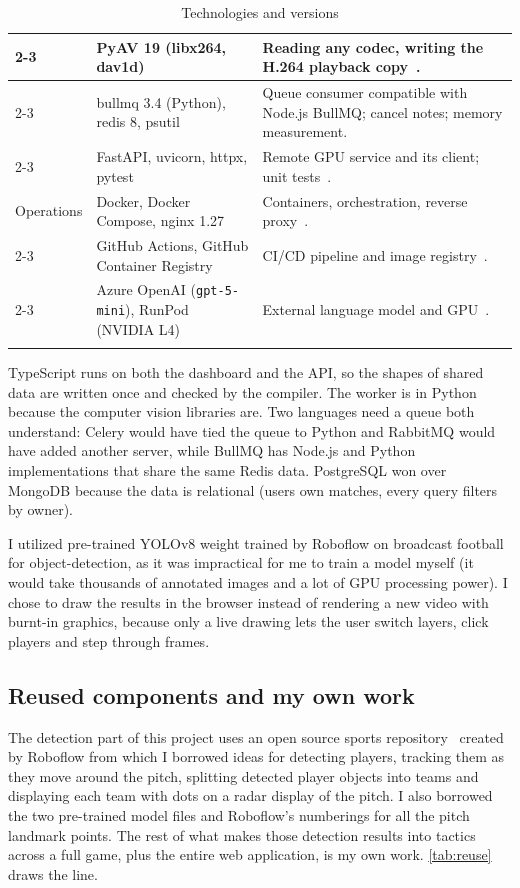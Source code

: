 \begin{longtable}{|p{}|p{}|p{}|}
	\cline{2-3}
	& PyAV 19 (libx264, dav1d) & Reading any codec, writing the H.264 playback copy~\cite{pyav}. \\
	\cline{2-3}
	& bullmq 3.4 (Python), redis 8, psutil & Queue consumer compatible with Node.js BullMQ; cancel notes; memory measurement. \\
	\cline{2-3}
	& FastAPI, uvicorn, httpx, pytest & Remote GPU service and its client; unit tests~\cite{pytest}. \\
	\hline
	Operations & Docker, Docker Compose, nginx 1.27 & Containers, orchestration, reverse proxy~\cite{docker}. \\
	\cline{2-3}
	& GitHub Actions, GitHub Container Registry & CI/CD pipeline and image registry~\cite{ghactions}. \\
	\cline{2-3}
	& Azure OpenAI (\texttt{gpt-5-mini}), RunPod (NVIDIA L4) & External language model and GPU~\cite{runpod}. \\
	\hline
	\caption{Technologies and versions}
	\label{tab:technologies}
\end{longtable}

TypeScript runs on both the dashboard and the API, so the shapes of shared data are written once and checked by the compiler. The worker is in Python because the computer vision libraries are. Two languages need a queue both understand: Celery would have tied the queue to Python and RabbitMQ would have added another server, while BullMQ has Node.js and Python implementations that share the same Redis data. PostgreSQL won over MongoDB because the data is relational (users own matches, every query filters by owner).

I utilized pre-trained YOLOv8 weight trained by Roboflow on broadcast football~\cite{roboflowsports} for object-detection, as it was impractical for me to train a model myself (it would take thousands of annotated images and a lot of GPU processing power). I chose to draw the results in the browser instead of rendering a new video with burnt-in graphics, because only a live drawing lets the user switch layers, click players and step through frames.

\subsection{Reused components and my own work}
\label{sec:reuse}

The detection part of this project uses an open source sports repository~\cite{roboflowsports} created by Roboflow from which I borrowed ideas for detecting players, tracking them as they move around the pitch, splitting detected player objects into teams and displaying each team with dots on a radar display of the pitch. I also borrowed the two pre-trained model files and Roboflow's numberings for all the pitch landmark points. The rest of what makes those detection results into tactics across a full game, plus the entire web application, is my own work. \autoref{tab:reuse} draws the line.

